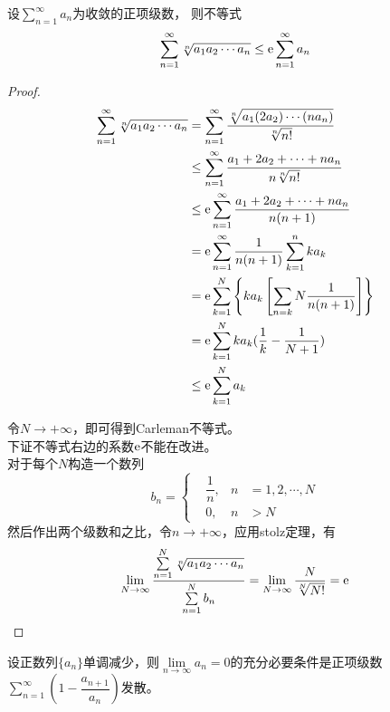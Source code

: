 \begin{proposition}[Carleman不等式]

    设$\sum\limits_{n=1}^{\infty}{a_n}$为收敛的正项级数，
    则不等式
    $$\sum_{n=1}^{\infty}{\sqrt[n]{a_1a_2\cdots a_n}}\leq \mathrm{e}\sum_{n=1}^{\infty}{a_n}$$

\end{proposition}

\begin{proof}

    \begin{align*}
        \sum_{n=1}^{\infty}{\sqrt[n]{a_1a_2\cdots a_n}} &= \sum_{n=1}^{\infty}{\dfrac{\sqrt[n]{a_1(2a_2)\cdots (na_n)}}{\sqrt[n]{n!}}}\\
        &\leq\sum_{n=1}^{\infty}{\dfrac{a_1+2a_2+\cdots +na_n}{n\sqrt[n]{n!}}}\\
        &\leq\mathrm{e}\sum_{n=1}^{\infty}{\dfrac{a_1+2a_2+\cdots +na_n}{n(n+1)}}\\
        &=\mathrm{e}\sum_{n=1}^{\infty}{\dfrac{1}{n(n+1)}\sum_{k=1}^{n}{ka_k}}\\
        &=\mathrm{e}\sum_{k=1}^{N}{\left\{ka_k\left[\sum_{n=k}{N}{\dfrac{1}{n(n+1)}}\right]\right\}}\\
        &=\mathrm{e}\sum_{k=1}^{N}{ka_k(\dfrac{1}{k}-\dfrac{1}{N+1})} \\
        &\leq\mathrm{e}\sum_{k=1}^{N}{a_k}
    \end{align*}

    令$N\to+\infty$，即可得到\textup{Carleman}不等式。\\
    下证不等式右边的系数$\mathrm{e}$不能在改进。\\
    对于每个$N$构造一个数列
    $$b_n=\left\{
        \begin{aligned}
            &\dfrac{1}{n}, & n & = 1,2,\cdots,N \\
            &0, & n & > N
        \end{aligned}
    \right.
    $$
    然后作出两个级数和之比，令$n\to+\infty$，应用\textup{stolz}定理，有
    $$\lim_{N\to\infty}{\dfrac{\sum\limits_{n=1}^{N}{\sqrt[n]{a_1a_2\cdots a_n}}}{\sum\limits_{n=1}^{N}{b_n}}}=\lim_{N\to\infty}{\dfrac{N}{\sqrt[N]{N!}}}=\mathrm{e}$$

\end{proof}

\begin{theorem}[Sapagof判别法]

设正数列$\{a_n\}$单调减少，则$\lim\limits_{n\to\infty}{a_n}=0$的充分必要条件是正项级数$\sum\limits_{n=1}^{\infty}{(1-\dfrac{a_{n+1}}{a_n})}$发散。
    
\end{theorem}

